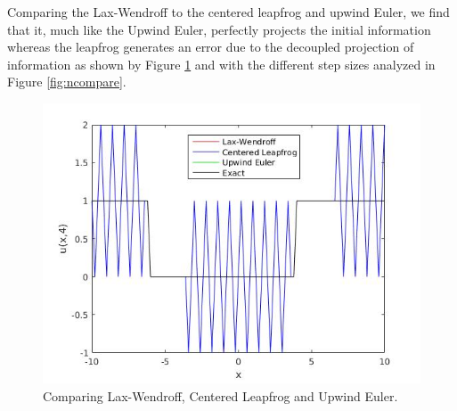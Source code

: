 Comparing the Lax-Wendroff to the centered leapfrog and upwind Euler, we find that it, much like the Upwind Euler, perfectly projects the initial information whereas the leapfrog generates an error due to the decoupled projection of information as shown by Figure \ref{fig:stepcompare} and with the different step sizes analyzed in Figure \ref{fig:ncompare}.
\begin{figure}[H]
 \centering
 \includegraphics[scale=0.5]{Images/5_lw_cl_ue.jpg}
 \caption{Comparing Lax-Wendroff, Centered Leapfrog and Upwind Euler.}
  \label{fig:stepcompare}
\end{figure}
